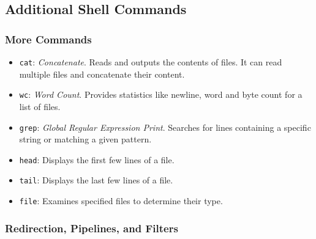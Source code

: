 \begin{exampleblock}
\end{exampleblock}

\vspace{-0.5em}

\subsection{Additional Shell Commands}
\vspace{-0.3em}

\subsubsection{More Commands}
\vspace{-0.3em}

\begin{itemize}
    \item \texttt{cat}: \textit{Concatenate}. Reads and outputs the contents of files. It can read multiple files and concatenate their content.
    \item \texttt{wc}: \textit{Word Count}. Provides statistics like newline, word and byte count for a list of files.
    \item \texttt{grep}: \textit{Global Regular Expression Print}. Searches for lines containing a specific string or matching a given pattern.
    \item \texttt{head}: Displays the first few lines of a file.
    \item \texttt{tail}: Displays the last few lines of a file.
    \item \texttt{file}: Examines specified files to determine their type.
\end{itemize}

\subsubsection{Redirection, Pipelines, and Filters}
\vspace{-0.3em}

